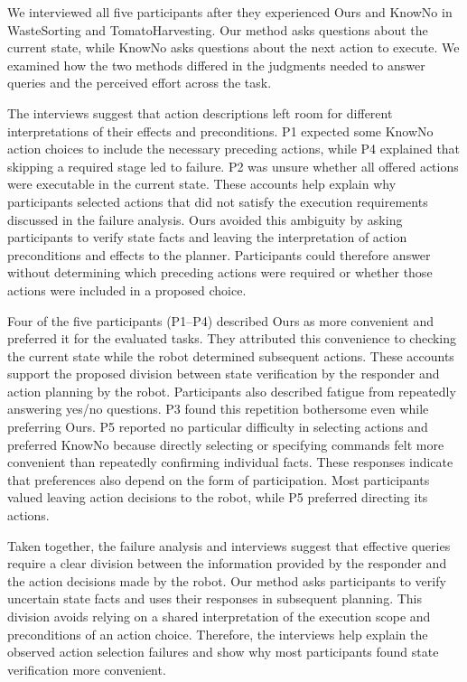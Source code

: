 We interviewed all five participants after they experienced Ours and KnowNo in WasteSorting and TomatoHarvesting. Our method asks questions about the current state, while KnowNo asks questions about the next action to execute. We examined how the two methods differed in the judgments needed to answer queries and the perceived effort across the task.

The interviews suggest that action descriptions left room for different interpretations of their effects and preconditions. P1 expected some KnowNo action choices to include the necessary preceding actions, while P4 explained that skipping a required stage led to failure. P2 was unsure whether all offered actions were executable in the current state. These accounts help explain why participants selected actions that did not satisfy the execution requirements discussed in the failure analysis. Ours avoided this ambiguity by asking participants to verify state facts and leaving the interpretation of action preconditions and effects to the planner. Participants could therefore answer without determining which preceding actions were required or whether those actions were included in a proposed choice.


Four of the five participants (P1--P4) described Ours as more convenient and preferred it for the evaluated tasks. They attributed this convenience to checking the current state while the robot determined subsequent actions. These accounts support the proposed division between state verification by the responder and action planning by the robot. Participants also described fatigue from repeatedly answering yes/no questions. P3 found this repetition bothersome even while preferring Ours. P5 reported no particular difficulty in selecting actions and preferred KnowNo because directly selecting or specifying commands felt more convenient than repeatedly confirming individual facts. These responses indicate that preferences also depend on the form of participation. Most participants valued leaving action decisions to the robot, while P5 preferred directing its actions.

Taken together, the failure analysis and interviews suggest that effective queries require a clear division between the information provided by the responder and the action decisions made by the robot. Our method asks participants to verify uncertain state facts and uses their responses in subsequent planning. This division avoids relying on a shared interpretation of the execution scope and preconditions of an action choice. Therefore, the interviews help explain the observed action selection failures and show why most participants found state verification more convenient.

